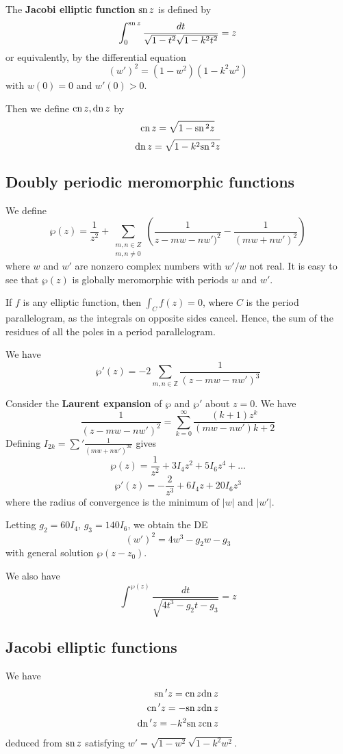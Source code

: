 \documentclass[10pt, oneside, reqno]{amsart}
\theoremstyle{plain}%
\theoremstyle{definition}
\theoremstyle{remark}
\newcommand{\Z}{\mathbb{Z}}
\begin{document}
\label{sub:inversion_of_ellitpic_integrals}
The \textbf{Jacobi elliptic function} $\text{sn}\, z$ is defined by \[
	\int_0^{\text{sn}\, z} \frac{dt}{\sqrt{1 - t^2}\sqrt{1 - k^2 t^2}} = z
\] or equivalently, by the differential equation \[
	(w')^2 = (1-w^2)(1 - k^2 w^2) 
\] with $w(0) = 0$ and $w'(0) > 0$.

Then we define $\text{cn}\, z, \text{dn}\, z$ by \[
	\text{cn}\, z = \sqrt{1 - \text{sn}\,^2 z}
\]\[
	\text{dn}\, z = \sqrt{1 - k^2 \text{sn}\,^2 z}
\]

\subsection{Doubly periodic meromorphic functions} %
\label{sub:doubly_periodic_meromorphic_functions}
 We define \[
 	\wp(z) = \frac{1}{z^2} + \sum_{\substack{m,n \in Z \\ m,n \neq 0}} \left( \frac{1}{z - mw - nw')^2} - \frac{1}{(mw + nw')^2} \right)
 \] where $w$ and $w'$ are nonzero complex numbers with $w'/w$ not real.  It is easy to see that $\wp(z)$ is globally meromorphic with periods $w$ and $w'$.  

If $f$ is any elliptic function, then $\int_C f(z) = 0$, where $C$ is the period parallelogram, as the integrals on opposite sides cancel.  Hence, the sum of the residues of all the poles in a period parallelogram.

We have \[
	\wp'(z) = -2 \sum_{m,n \in \Z} \frac{1}{(z - mw - nw')^3}
\]

Consider the \textbf{Laurent expansion} of $\wp$ and $\wp'$ about $z = 0$.  We have \[
	\frac{1}{(z - mw - nw')^2} = \sum_{k = 0}^\infty \frac{(k+1)z^k}{(mw - nw'){k+2}}
\]
Defining $I_{2k} = \sum' \frac{1}{(mw + nw')^{2k}}$ gives \[
	\wp(z) = \frac{1}{z^2} + 3I_4 z^2 + 5 I_6 z^4 + \dots
\]
\[
	\wp'(z) = -\frac{2}{z^3} + 6I_4 z + 20 I_6 z^3
\] where the radius of convergence is the minimum of $|w|$ and $|w'|$.

Letting $g_2 = 60 I_4$, $g_3 = 140 I_6$, we obtain the DE \[
	(w')^2 = 4w^3 - g_2 w - g_3
\] with general solution $\wp(z - z_0)$. 

We also have \[
	\int^{\wp(z)} \frac{dt}{\sqrt{4t^3 - g_2 t - g_3}} = z
\]


\subsection{Jacobi elliptic functions} %
\label{sub:jacobi_elliptic_functions}
 We have \begin{align*}
 	\text{sn}\,' z = \text{cn}\, z \text{dn}\, z \\
	\text{cn}\,' z = - \text{sn}\, z \text{dn}\, z \\
	\text{dn}\,' z = - k^2 \text{sn}\, z \text{cn}\, z
 \end{align*} deduced from $\text{sn}\, z$ satisfying $w' = \sqrt{1 - w^2}\sqrt{1 - k^2 w^2}$. 
\end{document}
